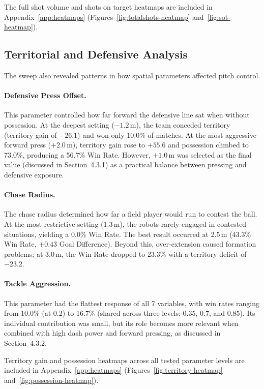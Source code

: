 \documentclass[12pt, a4paper]{report}
\begin{document}
The full shot volume and shots on target heatmaps are included in
Appendix~\ref{app:heatmaps} (Figures~\ref{fig:totalshots-heatmap}
and~\ref{fig:sot-heatmap}).

\subsection{Territorial and Defensive Analysis}

The sweep also revealed patterns in how spatial parameters affected pitch
control.

\paragraph{Defensive Press Offset.}
This parameter controlled how far forward the defensive line sat when
without possession.
At the deepest setting ($-1.2$\,m), the team conceded territory (territory
gain of $-26.1$) and won only 10.0\% of matches.
At the most aggressive forward press ($+2.0$\,m), territory gain rose to
$+55.6$ and possession climbed to 73.0\%, producing a 56.7\% Win Rate.
However, $+1.0$\,m was selected as the final value (discussed in
Section~4.3.1) as a practical balance between pressing and defensive
exposure.

\paragraph{Chase Radius.}
The chase radius determined how far a field player would run to contest the
ball.
At the most restrictive setting (1.3\,m), the robots rarely engaged in
contested situations, yielding a 0.0\% Win Rate.
The best result occurred at 2.5\,m (43.3\% Win Rate, $+0.43$ Goal
Difference). Beyond this, over-extension caused formation problems; at
3.0\,m, the Win Rate dropped to 23.3\% with a territory deficit of $-23.2$.

\paragraph{Tackle Aggression.}
This parameter had the flattest response of all 7 variables, with win rates
ranging from 10.0\% (at 0.2) to 16.7\% (shared across three levels: 0.35,
0.7, and 0.85).
Its individual contribution was small, but its role becomes more relevant
when combined with high dash power and forward pressing, as discussed in
Section~4.3.2.

Territory gain and possession heatmaps across all tested parameter levels
are included in Appendix~\ref{app:heatmaps}
(Figures~\ref{fig:territory-heatmap} and~\ref{fig:possession-heatmap}).
\end{document}
